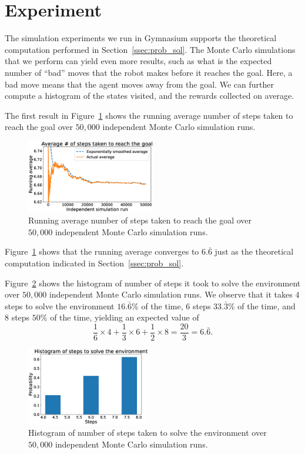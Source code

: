 \section{Experiment}
\label{sec:experiment}
%
The simulation experiments we run in Gymnasium supports the theoretical
computation performed in Section~\ref{ssec:prob_sol}. The Monte Carlo
simulations that we perform can yield even more results, such as what is the 
expected number of ``bad'' moves that the robot makes before it reaches the goal. Here, a bad move means that the agent moves away from the goal. We can 
further compute a histogram of the states visited, and the rewards collected on 
average.

The first result in Figure~\ref{fig:running_avg} shows the running average
number of steps taken to reach the goal over $50,000$ independent Monte Carlo
simulation runs.
%
\begin{figure}[tb]
    \centering
    \includegraphics[width=0.5\textwidth]{./figures/running_avg.eps}
    \caption{Running average number of steps taken to reach the goal over $50,000$ independent Monte Carlo simulation runs.}
    \label{fig:running_avg}
\end{figure}
%
Figure~\ref{fig:running_avg} shows that the running average converges to $6.\bar{6}$ just as the theoretical computation indicated in Section~\ref{ssec:prob_sol}.

Figure~\ref{fig:histogram} shows the histogram of number of steps it took to 
solve the environment over $50,000$ independent Monte Carlo simulation runs. We 
observe that it takes $4$ steps to solve the environment $16.\bar{6}\%$ of the time, $6$ steps $33.\bar{3}\%$ of the time, and $8$ steps $50\%$ of the time, yielding an expected value of 
%
\[
\frac{1}{6} \times 4 + \frac{1}{3} \times 6 + \frac{1}{2} \times 8 = \frac{20}{3} = 6.\bar{6}.
\]
%
\begin{figure}[bt]
    \centering
    \includegraphics[width=0.48\textwidth]{./figures/steps_histogram.eps}
    \caption{Histogram of number of steps taken to solve the environment over $50,000$ independent Monte Carlo simulation runs.}
    \label{fig:histogram}
\end{figure}

